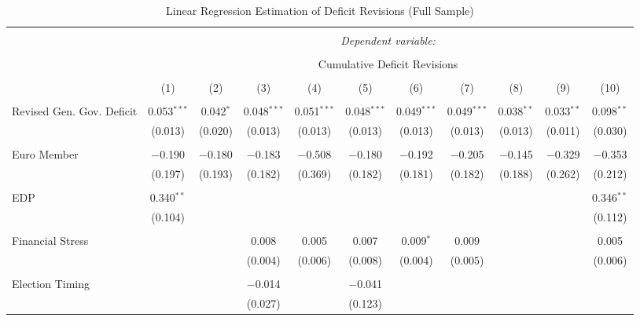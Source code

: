 
\begin{table}[!htbp] \centering 
  \caption{Linear Regression Estimation of Deficit Revisions (Full Sample)} 
  \label{deficit_results} 
\tiny 
\begin{tabular}{@{\extracolsep{5pt}}lcccccccccc} 
\\[-1.8ex]\hline 
\hline \\[-1.8ex] 
 & \multicolumn{10}{c}{\textit{Dependent variable:}} \\ 
\cline{2-11} 
\\[-1.8ex] & \multicolumn{10}{c}{Cumulative Deficit Revisions} \\ 
\\[-1.8ex] & (1) & (2) & (3) & (4) & (5) & (6) & (7) & (8) & (9) & (10)\\ 
\hline \\[-1.8ex] 
 Revised Gen. Gov. Deficit & 0.053$^{***}$ & 0.042$^{*}$ & 0.048$^{***}$ & 0.051$^{***}$ & 0.048$^{***}$ & 0.049$^{***}$ & 0.049$^{***}$ & 0.038$^{**}$ & 0.033$^{**}$ & 0.098$^{**}$ \\ 
  & (0.013) & (0.020) & (0.013) & (0.013) & (0.013) & (0.013) & (0.013) & (0.013) & (0.011) & (0.030) \\ 
  & & & & & & & & & & \\ 
 Euro Member & $-$0.190 & $-$0.180 & $-$0.183 & $-$0.508 & $-$0.180 & $-$0.192 & $-$0.205 & $-$0.145 & $-$0.329 & $-$0.353 \\ 
  & (0.197) & (0.193) & (0.182) & (0.369) & (0.182) & (0.181) & (0.182) & (0.188) & (0.262) & (0.212) \\ 
  & & & & & & & & & & \\ 
 EDP & 0.340$^{**}$ &  &  &  &  &  &  &  &  & 0.346$^{**}$ \\ 
  & (0.104) &  &  &  &  &  &  &  &  & (0.112) \\ 
  & & & & & & & & & & \\ 
 Financial Stress &  &  & 0.008 & 0.005 & 0.007 & 0.009$^{*}$ & 0.009 &  &  & 0.005 \\ 
  &  &  & (0.004) & (0.006) & (0.008) & (0.004) & (0.005) &  &  & (0.006) \\ 
  & & & & & & & & & & \\ 
 Election Timing &  &  & $-$0.014 &  & $-$0.041 &  &  &  &  &  \\ 
  &  &  & (0.027) &  & (0.123) &  &  &  &  &  \\ 

\end{tabular}
\end{table}
